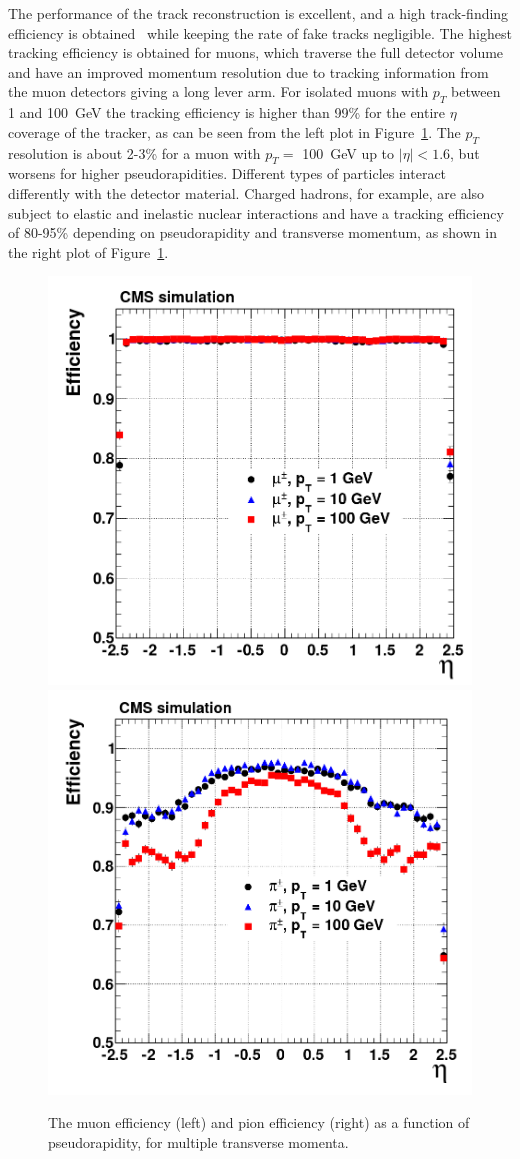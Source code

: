 The performance of the track reconstruction is excellent, and a high track-finding efficiency is obtained~\cite{Chatrchyan:2014fea} while keeping the rate of fake tracks negligible. The highest tracking efficiency is obtained for muons, which traverse the full detector volume and have an improved momentum resolution due to tracking information from the muon detectors giving a long lever arm. For isolated muons with $p_T$ between 1 and \SI{100}{GeV} the tracking efficiency is higher than 99\% for the entire $\eta$ coverage of the tracker, as can be seen from the left plot in Figure~\ref{fig:eff_eta}. The $p_T$ resolution is about 2-3\% for a muon with $p_T = $ \SI{100}{GeV} up to $|\eta| < 1.6$, but worsens for higher pseudorapidities. Different types of particles interact differently with the detector material. Charged hadrons, for example, are also subject to elastic and inelastic nuclear interactions and have a tracking efficiency of 80-95\% depending on pseudorapidity and transverse momentum, as shown in the right plot of Figure~\ref{fig:eff_eta}.

\begin{figure}[ht]
  \centering
\includegraphics[width=.4\textwidth]{muon_eff_eta}\hspace{1cm}
 \includegraphics[width=.4\textwidth]{pion_eff_eta} 
 \caption{The muon efficiency (left) and pion efficiency (right) as a function of pseudorapidity, for multiple transverse momenta.~\cite{Chatrchyan:2014fea}}
 \label{fig:eff_eta}
\end{figure}

